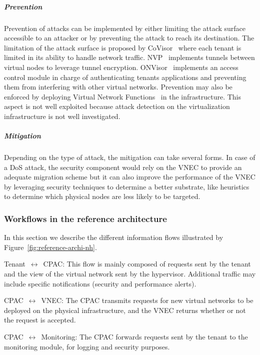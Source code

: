 \subparagraph{Prevention}
Prevention of attacks can be implemented by either limiting the attack surface accessible to an attacker or by preventing the attack to reach its destination. The limitation of the attack surface is proposed by CoVisor~\cite{CoVisor-Jin2015} where each tenant is limited in its ability to handle network traffic.
NVP~\cite{NVP-Koponen2014} implements tunnels between virtual nodes to leverage tunnel encryption.
ONVisor~\cite{ONVisor-Han2018} implements an access control module in charge of authenticating tenants applications and preventing them from interfering with other virtual networks.
Prevention may also be enforced by deploying Virtual Network Functions~\cite{vnf} in the infrastructure. This aspect is not well exploited because attack detection on the virtualization infrastructure is not well investigated. 

\subparagraph{Mitigation}
Depending on the type of attack, the mitigation can take several forms. 
In case of a DoS attack, the security component would rely on the VNEC to provide an adequate migration scheme but it can also improve the performance of the VNEC by leveraging security techniques to determine a better substrate, like heuristics to determine which physical nodes are less likely to be targeted. 

\subsubsection{Workflows in the reference architecture}
In this section we describe the different information flows illustrated by Figure~\ref{fig:reference-archi-nh}.

 Tenant~$\leftrightarrow$~CPAC: This flow is mainly composed of requests sent by the tenant and the view of the virtual network sent by the hypervisor. Additional traffic may include specific notifications (\eg security and performance alerts).

 CPAC~$\leftrightarrow$~VNEC: The CPAC transmits requests for new virtual networks to be deployed on the physical infrastructure, and the VNEC returns whether or not the request is accepted.

 CPAC~$\leftrightarrow$~Monitoring: The CPAC forwards requests sent by the tenant to the monitoring module, for logging and security purposes. 

